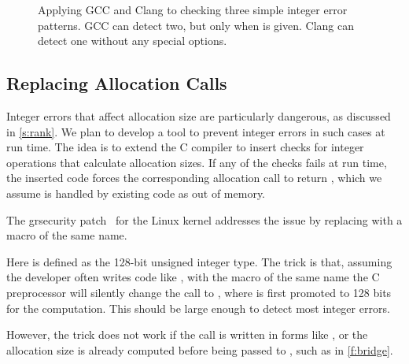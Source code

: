 \begin{figure}
\centering

\caption{Applying GCC and Clang to checking three simple integer
error patterns.  GCC can detect two, but only when  is
given.  Clang can detect one without any special options.}
\label{f:cmp-stat}
\end{figure}

\subsection{Replacing Allocation Calls}

Integer errors that affect allocation size are particularly dangerous,
as discussed in \autoref{s:rank}.
We plan to develop a tool to prevent integer errors
in such cases at run time.
The idea is to extend the C compiler
to insert checks for integer operations that calculate allocation sizes.
If any of the checks fails at run time,
the inserted code forces the corresponding allocation call to return
, which we assume is handled by existing code
as out of memory.

\fi

The grsecurity patch~\cite{grsecurity}
for the Linux kernel addresses the issue by replacing
 with a macro of the same name.
%

%
Here  is defined as the 128-bit unsigned integer
type.  The trick is that, assuming the developer often writes code
like , with the macro of the same name
the C preprocessor will silently change the call to
, where  is first
promoted to 128 bits for the computation.  This should be large
enough to detect most integer errors.

However, the trick does not work if the call is written in forms
like , or the allocation
size is already computed before being passed to , such
as in \autoref{f:bridge}.
\fi
